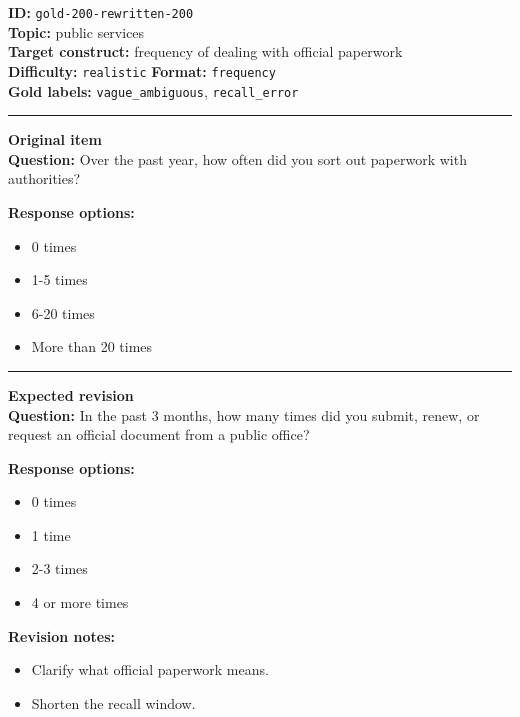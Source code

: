 \documentclass[10pt,a4paper]{article}
\newcommand{\sectionline}{\vspace{0.15em}\hrule\vspace{0.35em}}
\begin{document}
\begin{tcolorbox}[colframe=FlawRed,colback=white,colbacktitle=FlawRed!9,coltitle=black,title={Item 200\hfill Flawed item}]
\textbf{ID:} \texttt{gold-200-rewritten-200}\\
\textbf{Topic:} public services\\
\textbf{Target construct:} frequency of dealing with official paperwork\\
\textbf{Difficulty:} \texttt{realistic} \quad \textbf{Format:} \texttt{frequency}\\
\textbf{Gold labels:} \texttt{vague\_ambiguous}, \texttt{recall\_error}\\
\sectionline
\textbf{Original item}\\
\textbf{Question:} Over the past year, how often did you sort out paperwork with authorities?
\par\textbf{Response options:}
\begin{itemize}
\item 0 times
\item 1-5 times
\item 6-20 times
\item More than 20 times
\end{itemize}
\sectionline
\textbf{Expected revision}\\
\textbf{Question:} In the past 3 months, how many times did you submit, renew, or request an official document from a public office?
\par\textbf{Response options:}
\begin{itemize}
\item 0 times
\item 1 time
\item 2-3 times
\item 4 or more times
\end{itemize}
\par\textbf{Revision notes:}
\begin{itemize}
\item Clarify what official paperwork means.
\item Shorten the recall window.
\end{itemize}
\end{tcolorbox}
\end{document}
